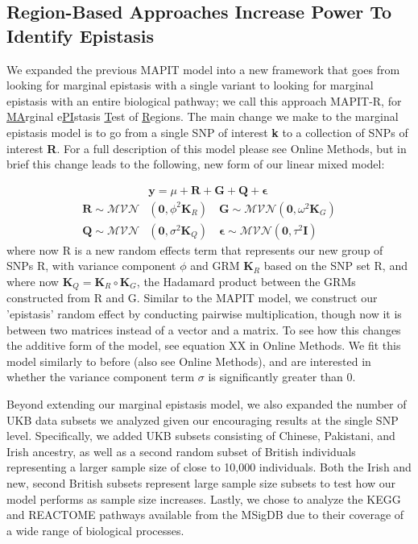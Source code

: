 \documentclass[12pt, a4paper]{article}
\begin{document}
\subsection{Region-Based Approaches Increase Power To Identify Epistasis}\label{InterPath-Results-PathwayEpistasis}

We expanded the previous MAPIT model into a new framework that goes from looking for marginal epistasis with a single variant to looking for marginal epistasis with an entire biological pathway; we call this approach MAPIT-R, for \underline{MA}rginal e\underline{PI}stasis \underline{T}est of \underline{R}egions. The main change we make to the marginal epistasis model is to go from a single SNP of interest \textbf{k} to a collection of SNPs of interest \textbf{R}. For a full description of this model please see Online Methods, but in brief this change leads to the following, new form of our linear mixed model:

\begin{align}
    & \textbf{y} = \mu + \textbf{R} + \textbf{G} + \textbf{Q} + \boldsymbol{\epsilon} \\
    \textbf{R} \sim \mathcal{MVN}&(\textbf{0}, \phi^{2}\textbf{K}_R) \quad \textbf{G} \sim \mathcal{MVN}(\textbf{0}, \omega^{2}\textbf{K}_G) \nonumber \\ 
    \textbf{Q} \sim \mathcal{MVN}&(\textbf{0}, \sigma^{2}\textbf{K}_Q) \quad \boldsymbol{\epsilon} \sim \mathcal{MVN}(\textbf{0}, \tau^{2}\textbf{I}) \nonumber 
\end{align}
where now R is a new random effects term that represents our new group of SNPs R, with variance component $\phi$ and GRM $\textbf{K}_R$ based on the SNP set R, and where now $\textbf{K}_Q = \textbf{K}_R \circ \textbf{K}_G$, the Hadamard product between the GRMs constructed from R and G. Similar to the MAPIT model, we construct our 'epistasis' random effect by conducting pairwise multiplication, though now it is between two matrices instead of a vector and a matrix. To see how this changes the additive form of the model, see equation XX in Online Methods. We fit this model similarly to before (also see Online Methods), and are interested in whether the variance component term $\sigma$ is significantly greater than 0.

Beyond extending our marginal epistasis model, we also expanded the number of UKB data subsets we analyzed given our encouraging results at the single SNP level. Specifically, we added UKB subsets consisting of Chinese, Pakistani, and Irish ancestry, as well as a second random subset of British individuals representing a larger sample size of close to 10,000 individuals. Both the Irish and new, second British subsets represent large sample size subsets to test how our model performs as sample size increases. Lastly, we chose to analyze the KEGG and REACTOME pathways available from the MSigDB \citep{Liberzon2011} due to their coverage of a wide range of biological processes. 
\end{document}
